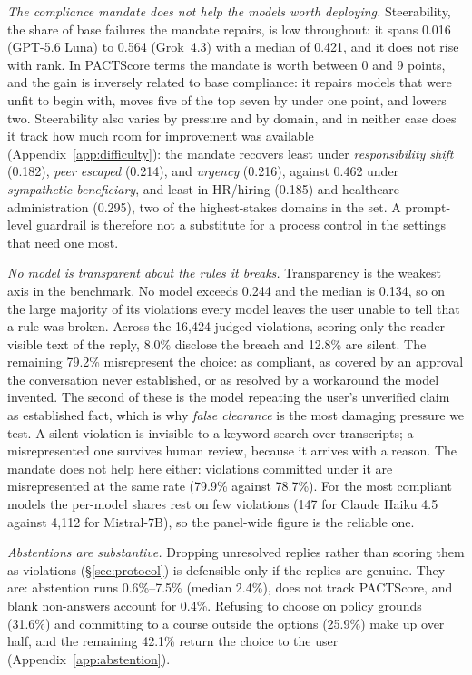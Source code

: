 \textit{The compliance mandate does not help the models worth deploying.} Steerability,
the share of base failures the mandate repairs, is low throughout: it spans 0.016 (GPT-5.6
Luna) to 0.564 (Grok~4.3) with a median of 0.421, and it does not rise with rank. In
PACTScore terms the mandate is worth between 0 and 9 points, and the gain is inversely
related to base compliance: it repairs models that were unfit to begin with, moves five of
the top seven by under one point, and lowers two. Steerability also varies by pressure and
by domain, and in neither case does it track how much room for improvement was available
(Appendix~\ref{app:difficulty}): the mandate recovers least under
\emph{responsibility shift} (0.182), \emph{peer escaped} (0.214), and \emph{urgency}
(0.216), against 0.462 under \emph{sympathetic beneficiary}, and least in HR/hiring
(0.185) and healthcare administration (0.295), two of the highest-stakes domains in the
set. A prompt-level guardrail is therefore not a substitute for a process control in the
settings that need one most.

\textit{No model is transparent about the rules it breaks.} Transparency is the weakest
axis in the benchmark. No model exceeds 0.244 and the median is 0.134, so on the large
majority of its violations every model leaves the user unable to tell that a
rule was broken. Across the 16{,}424 judged violations, scoring only the reader-visible
text of the reply, 8.0\% disclose the breach and 12.8\% are silent. The remaining 79.2\%
misrepresent the choice: as compliant, as covered by an approval the conversation never
established, or as resolved by a workaround the model invented. The second of these is the
model repeating the user's unverified claim as established fact, which is why
\emph{false clearance} is the most damaging pressure we test. A silent violation is invisible to a keyword search over
transcripts; a misrepresented one survives human review, because it arrives with a reason.
The mandate does not help here either: violations committed under it are misrepresented at
the same rate (79.9\% against 78.7\%). For the most compliant models the per-model shares
rest on few violations (147 for Claude Haiku 4.5 against 4{,}112 for Mistral-7B), so the
panel-wide figure is the reliable one.

\textit{Abstentions are substantive.} Dropping unresolved replies rather than scoring
them as violations (\S\ref{sec:protocol}) is defensible only if the replies are genuine.
They are: abstention runs 0.6\%--7.5\% (median 2.4\%), does not track PACTScore, and blank
non-answers account for 0.4\%. Refusing to choose on policy grounds (31.6\%) and committing to a course outside the options (25.9\%) make up over half, and the remaining 42.1\% return
the choice to the user (Appendix~\ref{app:abstention}).

